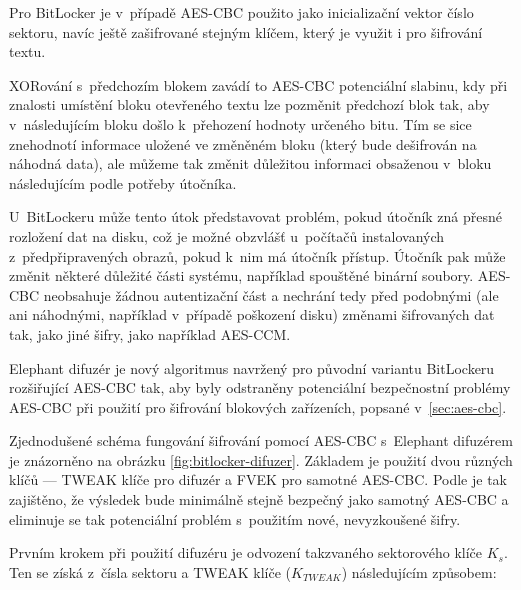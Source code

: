 
Pro BitLocker je v~případě AES-CBC použito jako inicializační vektor číslo sektoru, navíc ještě zašifrované stejným klíčem, který je využit i pro šifrování textu.

XORování s~předchozím blokem zavádí to AES-CBC potenciální slabinu, kdy při znalosti umístění bloku otevřeného textu lze pozměnit předchozí blok tak, aby v~následujícím bloku došlo k~přehození hodnoty určeného bitu. Tím se sice znehodnotí informace uložené ve změněném bloku (který bude dešifrován na náhodná data), ale můžeme tak změnit důležitou informaci obsaženou v~bloku následujícím podle potřeby útočníka.\cite{Regalado2013}

U~BitLockeru může tento útok představovat problém, pokud útočník zná přesné rozložení dat na disku, což je možné obzvlášť u~počítačů instalovaných z~předpřipravených obrazů, pokud k~nim má útočník přístup. Útočník pak může změnit některé důležité části systému, například spouštěné binární soubory.\cite{Ferguson2006,Rosendorf2013} AES-CBC neobsahuje žádnou autentizační část a nechrání tedy před podobnými (ale ani náhodnými, například v~případě poškození disku) změnami šifrovaných dat tak, jako jiné šifry, jako například AES-CCM.


Elephant difuzér je nový algoritmus navržený pro původní variantu BitLockeru rozšiřující AES-CBC tak, aby byly odstraněny potenciální bezpečnostní problémy AES-CBC při použití pro šifrování blokových zařízeních, popsané v~\ref{sec:aes-cbc}\cite{Ferguson2006}.


Zjednodušené schéma fungování šifrování pomocí AES-CBC s~Elephant difuzérem je znázorněno na obrázku \ref{fig:bitlocker-difuzer}. Základem je použití dvou různých klíčů --- TWEAK klíče pro difuzér a FVEK pro samotné AES-CBC. Podle \cite{Ferguson2006} je tak zajištěno, že výsledek bude minimálně stejně bezpečný jako samotný AES-CBC a eliminuje se tak potenciální problém s~použitím nové, nevyzkoušené šifry.

Prvním krokem při použití difuzéru je odvození takzvaného sektorového klíče $K_s$. Ten se získá z~čísla sektoru a TWEAK klíče ($K_{TWEAK}$) následujícím způsobem:

